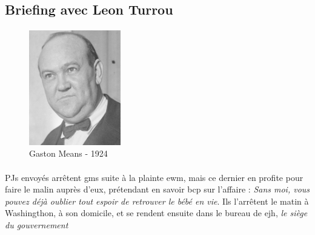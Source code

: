 \subsection{Briefing avec Leon Turrou}

\paragraph{} 

\begin{figure}
\begin{center}
 \includegraphics[width=40mm]{../pnjs/gaston-means-1924.png}
\end{center}
\caption{Gaston Means - 1924}
\end{figure}

\paragraph{} PJs envoyés arrêtent \gls{gms} suite à la plainte \gls{ewm}, mais ce dernier en profite pour faire le malin 
auprès d'eux, prétendant en savoir bcp sur l'affaire : \emph{Sans moi, vous pouvez déjà oublier tout espoir de retrouver le 
bébé en vie}. Ils l'arrêtent le matin à Washingthon, à son domicile, et se rendent ensuite dans le bureau de \gls{ejh}, 
\emph{le siège du gouvernement} 



